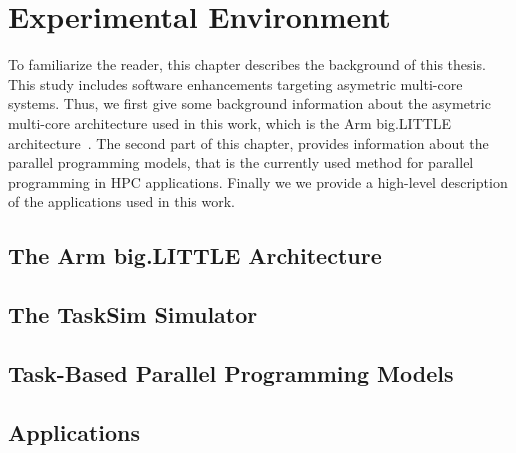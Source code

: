 \chapter{Experimental Environment}
\label{chapter.background} 
To familiarize the reader, this chapter describes the background of this thesis. 
This study includes software enhancements targeting asymetric multi-core systems.
Thus, we first give some background information about the asymetric multi-core architecture used in this work, which is the Arm big.LITTLE architecture~\cite{Greenhalgh2011}.
The second part of this chapter, provides information about the parallel programming models, that is the currently used method for parallel programming in HPC applications.
Finally we we provide a high-level description of the applications used in this work.
\newpage
\section{The Arm big.LITTLE Architecture}
\label{sec.background.arm}


\section{The TaskSim Simulator}
\label{sec.background.simulation}


\section{Task-Based Parallel Programming Models}
\label{sec.background.taskbased}


\section{Applications}
\label{sec.background.applications}

